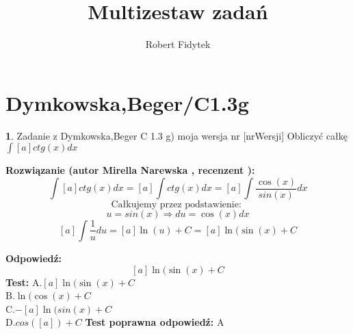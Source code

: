 \documentclass[12pt, a4paper]{article}
\title{Multizestaw zadań}
\author{Robert Fidytek}
\date{}
\theoremstyle{definition} %
\newtheorem{zad}{}
\newcommand{\kategoria}[1]{\section{#1}} %
\newcommand{\zadStart}[1]{\begin{zad}#1\newline} %
\newcommand{\zadStop}{\end{zad}}   %
\newcommand{\rozwStart}[2]{\noindent \textbf{Rozwiązanie (autor #1 , recenzent #2): }\newline} %
\newcommand{\odpStart}{\noindent \textbf{Odpowiedź:}\newline}    %
\newcommand{\odpStop}{\newline}                                             %
\newcommand{\testStart}{\noindent \textbf{Test:}\newline} %
\newcommand{\testStop}{\newline} %
\newcommand{\kluczStart}{\noindent \textbf{Test poprawna odpowiedź:}\newline} %
\newcommand{\kluczStop}{\newline} %
\begin{document}
\maketitle



\kategoria{Dymkowska,Beger/C1.3g}
\zadStart{Zadanie z Dymkowska,Beger C 1.3 g) moja wersja nr [nrWersji]}
Obliczyć całkę $\displaystyle \int [a] ctg(x) dx$
\zadStop
\rozwStart{Mirella Narewska}{}
$$\int [a] ctg(x) dx= [a] \int ctg(x) dx= [a] \int \frac{\cos(x)}{sin(x)}dx$$
$$\text{Całkujemy przez podstawienie: }$$
$$u=sin(x) \Rightarrow du=\cos(x) dx $$
$$\displaystyle [a] \int \frac{1}{u}du=\displaystyle [a]\ln(u) +C=[a]\ln(\sin(x) +C$$

\odpStart
$$[a]\ln(\sin(x) +C$$
\odpStop
\testStart
A.$[a]\ln(\sin(x) +C$
\\
B.$\ln(\cos(x) +C$
\\
C.$-[a]\ln(sin(x) +C$
\\
D.$cos([a])+C$
\testStop
\kluczStart
A
\kluczStop
\end{document}
